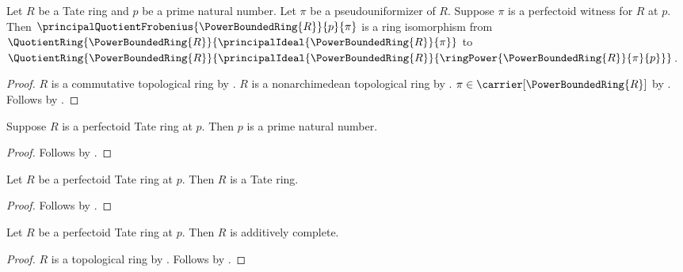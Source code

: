\begin{proposition}\label{perfectoid_witness_frobenius_isomorphism}
    Let $R$ be a Tate ring and $p$ be a prime natural number.
    Let $\pi$ be a pseudouniformizer of $R$.
    Suppose $\pi$ is a perfectoid witness for $R$ at $p$.
    Then $\principalQuotientFrobenius{\PowerBoundedRing{R}}{p}{\pi}$
        is a ring isomorphism from
        $\QuotientRing{\PowerBoundedRing{R}}{
            \principalIdeal{\PowerBoundedRing{R}}{\pi}}$ to
        $\QuotientRing{\PowerBoundedRing{R}}{
            \principalIdeal{\PowerBoundedRing{R}}{
                \ringPower{\PowerBoundedRing{R}}{\pi}{p}}}$.
\end{proposition}
\begin{proof}
    $R$ is a commutative topological ring by
        .
    $R$ is a nonarchimedean topological ring by
        .
    $\pi\in\carrier[\PowerBoundedRing{R}]$ by
        .
    Follows by .
\end{proof}

\begin{proposition}\label{perfectoid_tate_ring_prime}
    Suppose $R$ is a perfectoid Tate ring at $p$.
    Then $p$ is a prime natural number.
\end{proposition}
\begin{proof}
    Follows by .
\end{proof}

\begin{classification}\label{perfectoid_tate_ring_is_tate_ring}
    Let $R$ be a perfectoid Tate ring at $p$.
    Then $R$ is a Tate ring.
\end{classification}
\begin{proof}
    Follows by .
\end{proof}

\begin{proposition}\label{perfectoid_tate_ring_is_additively_complete}
    Let $R$ be a perfectoid Tate ring at $p$.
    Then $R$ is additively complete.
\end{proposition}
\begin{proof}
    $R$ is a topological ring by
        .
    Follows by .
\end{proof}

